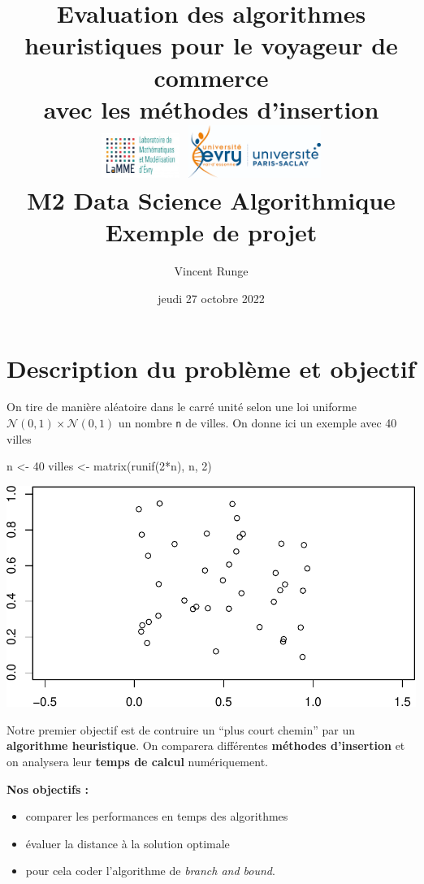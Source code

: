 \documentclass[
]{article}
\title{Evaluation des algorithmes heuristiques pour le voyageur de
commerce\\
avec les méthodes d'insertion\\
\includegraphics[width=1in,height=\textheight]{Images/logo_lamme.png}
\includegraphics[width=1.7in,height=\textheight]{Images/logo_UEVE.png}\\
\hspace*{0.333em}M2 Data Science Algorithmique\\
Exemple de projet}
\author{Vincent Runge}
\date{jeudi 27 octobre 2022}
\newenvironment{Shaded}{\begin{snugshade}}{\end{snugshade}}
\newcommand{\DecValTok}[1]{\textcolor[rgb]{0.00,0.00,0.81}{#1}}
\newcommand{\FunctionTok}[1]{\textcolor[rgb]{0.00,0.00,0.00}{#1}}
\newcommand{\NormalTok}[1]{#1}
\newcommand{\OtherTok}[1]{\textcolor[rgb]{0.56,0.35,0.01}{#1}}
\newcommand{\SpecialCharTok}[1]{\textcolor[rgb]{0.00,0.00,0.00}{#1}}
\begin{document}
\maketitle

{
\hypersetup{linkcolor=}
\setcounter{tocdepth}{2}
\tableofcontents
}
\noindent\hrulefill

\hypertarget{description-du-probluxe8me-et-objectif}{%
\section{Description du problème et
objectif}\label{description-du-probluxe8me-et-objectif}}

On tire de manière aléatoire dans le carré unité selon une loi uniforme
\(\mathcal{N}(0,1) \times \mathcal{N}(0,1)\) un nombre \texttt{n} de
villes. On donne ici un exemple avec 40 villes

\begin{Shaded}
\begin{Highlighting}[]
\NormalTok{n }\OtherTok{\textless{}{-}} \DecValTok{40}
\NormalTok{villes }\OtherTok{\textless{}{-}} \FunctionTok{matrix}\NormalTok{(}\FunctionTok{runif}\NormalTok{(}\DecValTok{2}\SpecialCharTok{*}\NormalTok{n), n, }\DecValTok{2}\NormalTok{)}
\end{Highlighting}
\end{Shaded}

\includegraphics{rapport_TSP_files/figure-latex/unnamed-chunk-2-1.pdf}

Notre premier objectif est de contruire un ``plus court chemin'' par un
\textbf{algorithme heuristique}. On comparera différentes
\textbf{méthodes d'insertion} et on analysera leur \textbf{temps de
calcul} numériquement.

\textbf{Nos objectifs : }

\begin{itemize}
\item
  comparer les performances en temps des algorithmes
\item
  évaluer la distance à la solution optimale
\item
  pour cela coder l'algorithme de \emph{branch and bound}.
\end{itemize}
\end{document}
